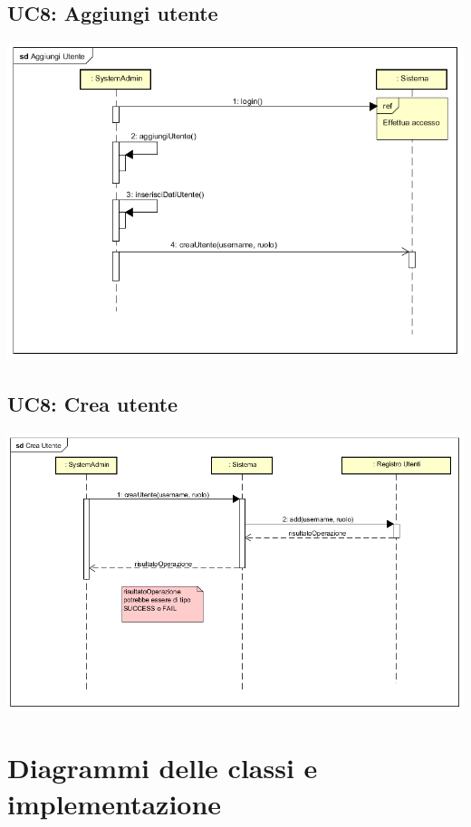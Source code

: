 \documentclass[12pt]{report}
\begin{document}
	\subsection{UC8: Aggiungi utente}
	\begin{center}
		\includegraphics{./images/AggiungiUtente.png}
	\end{center}
		
	\subsection{UC8: Crea utente}
	\begin{center}
		\includegraphics[scale=0.8]{./images/CreaUtente.png}
	\end{center}


	\newpage
	
	\section{Diagrammi delle classi e implementazione}
	
\end{document}
